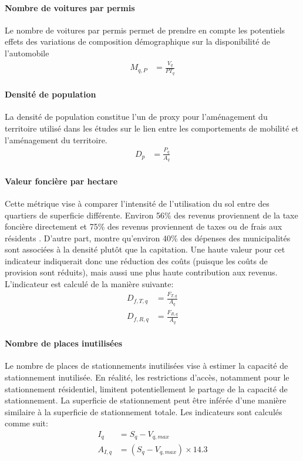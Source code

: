             \paragraph{Nombre de voitures par permis} Le nombre de voitures par permis permet de prendre en compte les potentiels effets des variations de composition démographique sur la disponibilité de l'automobile
            \begin{align}
                M_{q,P}&= \frac{V_q}{PT_q}\label{eq:voit-par-perm}
            \end{align}
            \paragraph{Densité de population} La densité de population constitue l'un de proxy pour l'aménagement du territoire utilisé dans les études sur le lien entre les comportements de mobilité et l'aménagement du territoire. 
            \begin{align}
                D_p &= \frac{P_q}{A_q} \label{eq:dens}
            \end{align}
            \paragraph{Valeur foncière par hectare} Cette métrique vise à comparer l'intensité de l'utilisation du sol entre des quartiers de superficie différente. Environ 56\% des revenus proviennent de la taxe foncière directement et 75\% des revenus proviennent de taxes ou de frais aux résidents \parencite{ville_de_quebec_budget_2025}. D'autre part, \textcite{metro_vancouver_regional_planning_cost_2023} montre qu'environ 40\% des dépenses des municipalités sont associées à la densité plutôt que la capitation. Une haute valeur pour cet indicateur indiquerait donc une réduction des coûts (puisque les coûts de provision sont réduits), mais aussi une plus haute contribution aux revenus. L'indicateur est calculé de la manière suivante:
            \begin{align}
                D_{f,T,q} &= \frac{F_{T,q}}{A_q}\label{eq:val-tot-sup}\\
                D_{f,R,q} &= \frac{F_{R,q}}{A_q}\label{eq:val-tot-log-sup}
            \end{align}
            \paragraph{Nombre de places inutilisées} Le nombre de places de stationnements inutilisées vise à estimer la capacité de stationnement inutilisée. En réalité, les restrictions d'accès, notamment pour le stationnement résidentiel, limitent potentiellement le partage de la capacité de stationnement. La superficie de stationnement peut être inférée d'une manière similaire à la superficie de stationnement totale. Les indicateurs sont calculés comme suit:
            \begin{align}
                I_q &= S_q - V_{q,max} \label{eq:stat-inu}\\
                A_{I,q} &= \left(S_q - V_{q,max}\right)\times 14.3\label{eq:stat-inu-sup}
            \end{align}
